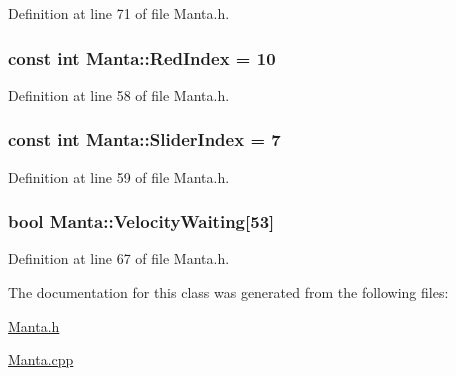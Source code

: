 \-Definition at line 71 of file \-Manta.\-h.

\hypertarget{classManta_a266da06045425ae8a1b1a53ed3d97d34}{
\subsubsection[{\-Red\-Index}]{\setlength{\rightskip}{0pt plus 5cm}const int {\bf \-Manta\-::\-Red\-Index} = 10}}\label{classManta_a266da06045425ae8a1b1a53ed3d97d34}


\-Definition at line 58 of file \-Manta.\-h.

\hypertarget{classManta_a710903745e9671b0da9281abb9b9dbf7}{
\subsubsection[{\-Slider\-Index}]{\setlength{\rightskip}{0pt plus 5cm}const int {\bf \-Manta\-::\-Slider\-Index} = 7}}\label{classManta_a710903745e9671b0da9281abb9b9dbf7}


\-Definition at line 59 of file \-Manta.\-h.

\hypertarget{classManta_a88d174f57a8df8b83d6f9d1facc68d77}{
\subsubsection[{\-Velocity\-Waiting}]{\setlength{\rightskip}{0pt plus 5cm}bool {\bf \-Manta\-::\-Velocity\-Waiting}\mbox{[}53\mbox{]}}}\label{classManta_a88d174f57a8df8b83d6f9d1facc68d77}


\-Definition at line 67 of file \-Manta.\-h.



\-The documentation for this class was generated from the following files\-:\begin{DoxyCompactItemize}
\item 
\hyperlink{Manta_8h}{\-Manta.\-h}\item 
\hyperlink{Manta_8cpp}{\-Manta.\-cpp}\end{DoxyCompactItemize}
